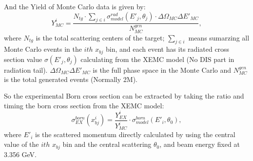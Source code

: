 And the Yield of Monte Carlo data is given by:
\begin{equation}
   Y^{i}_{MC} = \frac{N_{tg}\cdot \sum_{j\in i}\sigma^{rad}_{model}(E'_{j},\theta_{j})\cdot \Delta\Omega_{MC} \Delta E'_{MC}}{N_{MC}^{gen}} ,
   \label{eqymc}
\end{equation}
where $N_{tg}$ is the total scattering centers of the target; $\sum_{j\in i}$ means sumarzing all Monte Carlo events in the $ith$ $x_{bj}$ bin, and each event has its radiated cross section value $\sigma(E'_{j},\theta_{j})$ calculating from the XEMC model (No DIS part in radiation tail).  $\Delta\Omega_{MC} \Delta E'_{MC}$ is the full phase space in the Monte Carlo and $N_{MC}^{gen}$ is the total generated events (Normally 2M).

So the experimental Born cross section can be extracted by taking the ratio and timing the born cross section from the XEMC model:
\begin{equation}
   \sigma^{born}_{EX}(x_{bj}^{i}) = \frac{ Y^{i}_{EX}}{Y^{i}_{MC}} \cdot \sigma^{born}_{model}(E'_{i}, \theta_{0}),
   \label{eqxs}
\end{equation}
where $E'_{i}$ is the scattered momentum directly calculated by using the central value of the $ith$ $x_{bj}$ bin and the central scattering $\theta_{0}$, and beam energy fixed at 3.356 GeV.


